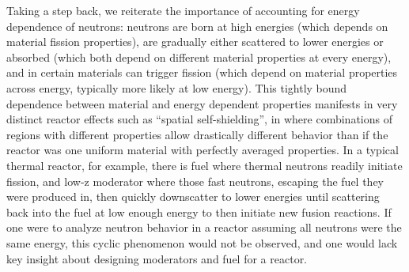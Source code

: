 \documentclass[11pt]{article} %
\begin{document}
Taking a step back, we reiterate the importance of accounting for energy dependence of neutrons: neutrons are born at high energies (which depends on material fission properties), are gradually either scattered to lower energies or absorbed (which both depend on different material properties at every energy), and in certain materials can trigger fission (which depend on material properties across energy, typically more likely at low energy).
This tightly bound dependence between material and energy dependent properties manifests in very distinct reactor effects such as ``spatial self-shielding'', in where combinations of regions with different properties allow drastically different behavior than if the reactor was one uniform material with perfectly averaged properties.
In a typical thermal reactor, for example, there is fuel where thermal neutrons readily initiate fission, and low-z moderator where those fast neutrons, escaping the fuel they were produced in, then quickly downscatter to lower energies until scattering back into the fuel at low enough energy to then initiate new fusion reactions.
If one were to analyze neutron behavior in a reactor assuming all neutrons were the same energy, this cyclic phenomenon would not be observed, and one would lack key insight about designing moderators and fuel for a reactor.
\end{document}
